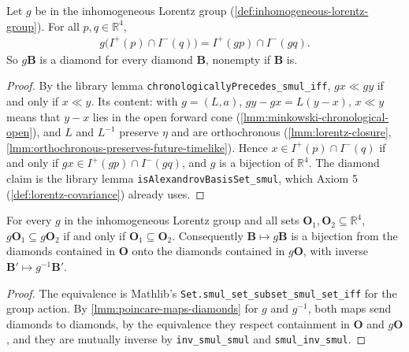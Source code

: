 \begin{lemma}
    \label{lmm:poincare-maps-diamonds}
    \leanok
    Let $g$ be in the inhomogeneous Lorentz group (\ref{def:inhomogeneous-lorentz-group}). For all $p, q \in \mathbb{R}^4$,
    \begin{align}
        g\big(I^+(p) \cap I^-(q)\big) = I^+(g p) \cap I^-(g q).
    \end{align}
    So $g\mathbf{B}$ is a diamond for every diamond $\mathbf{B}$, nonempty if $\mathbf{B}$ is.
\end{lemma}
\begin{proof}
    \leanok
    By the library lemma \texttt{chronologicallyPrecedes\_smul\_iff}, $gx \ll gy$ if and only if $x \ll y$. Its content: with $g = (L, a)$, $gy - gx = L(y - x)$, $x \ll y$ means that $y - x$ lies in the open forward cone (\ref{lmm:minkowski-chronological-open}), and $L$ and $L^{-1}$ preserve $\eta$ and are orthochronous (\ref{lmm:lorentz-closure}, \ref{lmm:orthochronous-preserves-future-timelike}). Hence $x \in I^+(p) \cap I^-(q)$ if and only if $gx \in I^+(gp) \cap I^-(gq)$, and $g$ is a bijection of $\mathbb{R}^4$. The diamond claim is the library lemma \texttt{isAlexandrovBasisSet\_smul}, which Axiom 5 (\ref{def:lorentz-covariance}) already uses.
\end{proof}

\begin{lemma}
    \label{lmm:poincare-diamond-inclusion}
    \leanok
    For every $g$ in the inhomogeneous Lorentz group and all sets $\mathbf{O}_1, \mathbf{O}_2 \subseteq \mathbb{R}^4$, $g\mathbf{O}_1 \subseteq g\mathbf{O}_2$ if and only if $\mathbf{O}_1 \subseteq \mathbf{O}_2$. Consequently $\mathbf{B} \mapsto g\mathbf{B}$ is a bijection from the diamonds contained in $\mathbf{O}$ onto the diamonds contained in $g\mathbf{O}$, with inverse $\mathbf{B}' \mapsto g^{-1}\mathbf{B}'$.
\end{lemma}
\begin{proof}
    \leanok
    The equivalence is Mathlib's \texttt{Set.smul\_set\_subset\_smul\_set\_iff} for the group action. By \ref{lmm:poincare-maps-diamonds} for $g$ and $g^{-1}$, both maps send diamonds to diamonds, by the equivalence they respect containment in $\mathbf{O}$ and $g\mathbf{O}$, and they are mutually inverse by \texttt{inv\_smul\_smul} and \texttt{smul\_inv\_smul}.
\end{proof}

